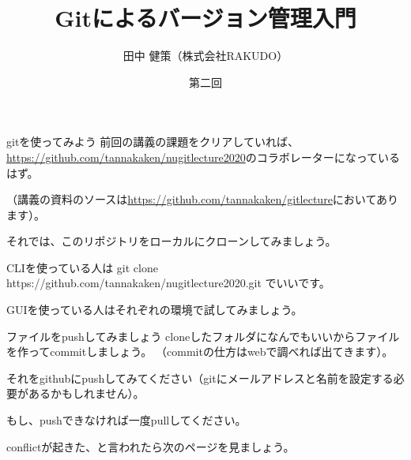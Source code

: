 \documentclass[12pt, unicode]{beamer}
\title{Gitによるバージョン管理入門}
\author{田中 健策（株式会社RAKUDO）}
\date[2020/12/11]{第二回}
\begin{document}
\frame{\maketitle}

\begin{frame}{gitを使ってみよう}
前回の講義の課題をクリアしていれば、\url{https://github.com/tannakaken/nugitlecture2020}のコラボレーターになっているはず。

（講義の資料のソースは\url{https://github.com/tannakaken/gitlecture}においてあります）。

それでは、このリポジトリをローカルにクローンしてみましょう。

CLIを使っている人は
git clone https://github.com/tannakaken/nugitlecture2020.git
でいいです。

GUIを使っている人はそれぞれの環境で試してみましょう。

\end{frame}

\begin{frame}{ファイルをpushしてみましょう}
cloneしたフォルダになんでもいいからファイルを作ってcommitしましょう。
（commitの仕方はwebで調べれば出てきます）。

それをgithubにpushしてみてください（gitにメールアドレスと名前を設定する必要があるかもしれません）。

もし、pushできなければ一度pullしてください。

conflictが起きた、と言われたら次のページを見ましょう。

\end{frame}
\end{document}
